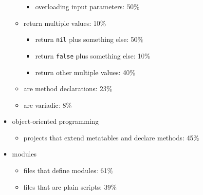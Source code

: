 \begin{itemize}
\begin{itemize}
\begin{itemize}
\item overloading input parameters: 50\%
\end{itemize}
\item return multiple values: 10\%
\begin{itemize}
\item return \texttt{nil} plus something else: 50\%
\item return \texttt{false} plus something else: 10\%
\item return other multiple values: 40\%
\end{itemize}
\item are method declarations: 23\%
\item are variadic: 8\%
\end{itemize}
\item object-oriented programming
\begin{itemize}
\item projects that extend metatables and declare methods: 45\%
\end{itemize}
\item modules
\begin{itemize}
\item files that define modules: 61\%
\item files that are plain scripts: 39\%
\end{itemize}
\end{itemize}
